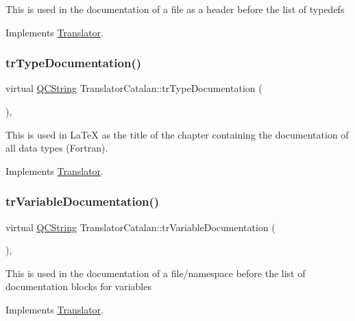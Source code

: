 This is used in the documentation of a file as a header before the list of typedefs 

Implements \mbox{\hyperlink{class_translator}{Translator}}.

\mbox{\label{class_translator_catalan_a840e3c846f74da0bc755ce0677efb254}} 
\subsubsection{\texorpdfstring{trTypeDocumentation()}{trTypeDocumentation()}}
{\footnotesize\ttfamily virtual \mbox{\hyperlink{class_q_c_string}{Q\+C\+String}} Translator\+Catalan\+::tr\+Type\+Documentation (\begin{DoxyParamCaption}{ }\end{DoxyParamCaption})\hspace{0.3cm}{\ttfamily [inline]}, {\ttfamily [virtual]}}

This is used in La\+TeX as the title of the chapter containing the documentation of all data types (Fortran). 

Implements \mbox{\hyperlink{class_translator}{Translator}}.

\mbox{\label{class_translator_catalan_a1a207ff2182a30f7840aedfe63719570}} 
\subsubsection{\texorpdfstring{trVariableDocumentation()}{trVariableDocumentation()}}
{\footnotesize\ttfamily virtual \mbox{\hyperlink{class_q_c_string}{Q\+C\+String}} Translator\+Catalan\+::tr\+Variable\+Documentation (\begin{DoxyParamCaption}{ }\end{DoxyParamCaption})\hspace{0.3cm}{\ttfamily [inline]}, {\ttfamily [virtual]}}

This is used in the documentation of a file/namespace before the list of documentation blocks for variables 

Implements \mbox{\hyperlink{class_translator}{Translator}}.

